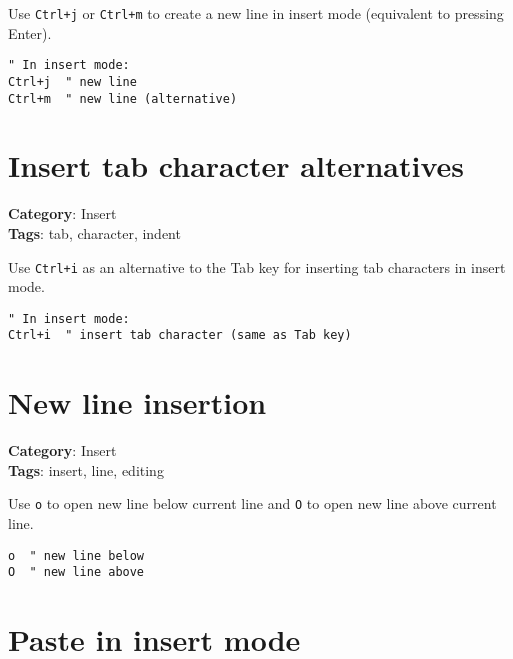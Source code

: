 {{{{{{Use {\footnotesize \Verb§Ctrl+j§} or {\footnotesize \Verb§Ctrl+m§} to create a new line in insert mode (equivalent to pressing Enter).

\begin{Exa*}{}
\begin{Verbatim}[fontsize=\footnotesize, breaklines, breakanywhere]
" In insert mode:
Ctrl+j  " new line
Ctrl+m  " new line (alternative)
\end{Verbatim}
\end{Exa*}

\section{Insert tab character alternatives}

\textbf{Category}: Insert\\ \textbf{Tags}: tab, character, indent
\vspace{0.5cm}

Use {\footnotesize \Verb§Ctrl+i§} as an alternative to the Tab key for inserting tab characters in insert mode.

\begin{Exa*}{}
\begin{Verbatim}[fontsize=\footnotesize, breaklines, breakanywhere]
" In insert mode:
Ctrl+i  " insert tab character (same as Tab key)
\end{Verbatim}
\end{Exa*}

\section{New line insertion}

\textbf{Category}: Insert\\ \textbf{Tags}: insert, line, editing
\vspace{0.5cm}

Use {\footnotesize \Verb§o§} to open new line below current line and {\footnotesize \Verb§O§} to open new line above current line.

\begin{Exa*}{}
\begin{Verbatim}[fontsize=\footnotesize, breaklines, breakanywhere]
o  " new line below
O  " new line above
\end{Verbatim}
\end{Exa*}

\section{Paste in insert mode}

}}}}}}
